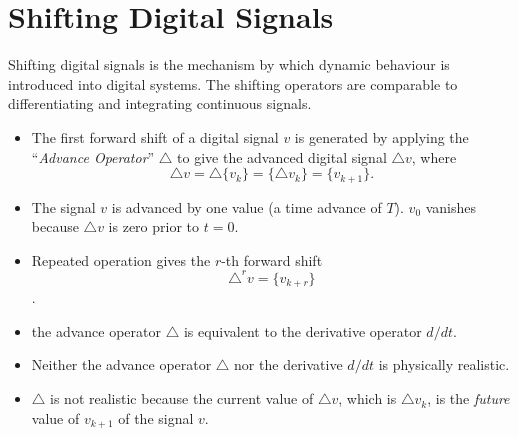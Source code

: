 \ifslidesonly
\begin{slide}

\end{slide}
\fi


\section*{Shifting Digital Signals}
Shifting digital signals is the mechanism by which dynamic
behaviour is introduced into digital systems. The shifting
operators are comparable to differentiating and integrating
continuous signals.

\begin{slide}
  \label{slide:l7s4}
\begin{itemize}

\item   The first forward shift of a digital signal $v$ is generated by
  applying the ``\emph{Advance Operator}'' $\triangle$  to give the
  advanced digital signal $\triangle v$, where \[ \triangle v = \triangle
  \{v_k\} = \{\triangle v_k\} = \{v_{k+1}\}.\]


\item   The signal $v$ is advanced by one value (a time advance of
  $T$). $v_0$ vanishes because $\triangle v$ is zero prior to $t=0$.


\item   Repeated operation gives the $r$-th forward shift \[
  \triangle^r v = \{v_{k+r}\}\].

\end{itemize}

\end{slide}

\begin{slide}
\label{slide:l7s4a}

\begin{itemize}

\item the advance operator $\triangle$ is equivalent to the derivative operator
  $d/dt$.

\item   Neither the advance operator $\triangle$ nor the derivative
  $d/dt$ is physically realistic.

\item $\triangle$ is not realistic because
  the current value of $\triangle v$, which is $\triangle v_k$,
  is the \emph{future} value of $v_{k+1}$ of the signal $v$.

\end{itemize}
\end{slide}


